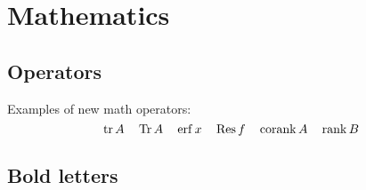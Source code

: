 \documentclass{article}
\def\separator{\vskip\baselineskip\hrule\vskip\baselineskip}
\begin{document}










\section{Mathematics}

\subsection{Operators}

Examples of new math operators:
\begin{equation}
  \operatorname{tr}{A}\quad \operatorname{Tr}{A}\quad \operatorname{erf}{x}\quad \operatorname{Res}{f}\quad \operatorname{corank}{A}\quad \operatorname{rank}{B}
\end{equation}

\subsection{Bold letters}
\end{document}

